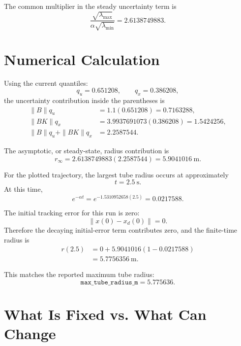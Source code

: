 \documentclass[11pt]{article}
\begin{document}
The common multiplier in the steady uncertainty term is
\[
\frac{\sqrt{\lambda_{\max}}}{\alpha\sqrt{\lambda_{\min}}}
= 2.6138749883.
\]

\section*{Numerical Calculation}

Using the current quantiles:
\[
q_u = 0.651208, \qquad q_x = 0.386208,
\]
the uncertainty contribution inside the parentheses is
\[
\begin{aligned}
\|B\|q_u &= 1.1(0.651208) = 0.7163288,\\
\|BK\|q_x &= 3.9937691073(0.386208) = 1.5424256,\\
\|B\|q_u+\|BK\|q_x &= 2.2587544.
\end{aligned}
\]

The asymptotic, or steady-state, radius contribution is
\[
r_\infty
= 2.6138749883(2.2587544)
= 5.9041016\ \text{m}.
\]

For the plotted trajectory, the largest tube radius occurs at approximately
\[
t = 2.5\ \text{s}.
\]
At this time,
\[
e^{-\alpha t}
= e^{-1.5310952658(2.5)}
= 0.0217588.
\]

The initial tracking error for this run is zero:
\[
\|x(0)-x_d(0)\| = 0.
\]
Therefore the decaying initial-error term contributes zero, and the finite-time
radius is
\[
\begin{aligned}
r(2.5)
&= 0
+ 5.9041016(1-0.0217588)\\
&= 5.7756356\ \text{m}.
\end{aligned}
\]

This matches the reported maximum tube radius:
\[
\texttt{max\_tube\_radius\_m} = 5.775636.
\]

\section*{What Is Fixed vs. What Can Change}
\end{document}
